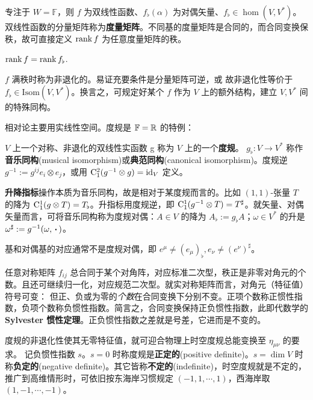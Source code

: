 专注于 $W=\mathbb F$，则 $f$ 为双线性函数、$f_\flat(\alpha)$ 为对偶矢量、$f_\flat\in\hom(V,V^*)$。
双线性函数的分量矩阵称为\textbf{度量矩阵}。不同基的度量矩阵是合同的，而合同变换保秩，故可直接定义 $\rank f$ 为任意度量矩阵的秩。

\begin{theorem}
    $\rank f=\rank f_\flat$.
\end{theorem}

$f$ 满秩时称为非退化的。易证充要条件是分量矩阵可逆，或
故非退化性等价于 $f_\flat\in\mathrm{Isom}(V,V^*)$。换言之，可规定好某个 $f$ 作为 $V$ 上的额外结构，建立 $V,V^*$ 间的特殊同构。

相对论主要用实线性空间。度规是 $\mathbb F=\mathbb{R}$ 的特例：

\begin{definition}
    $V$ 上一个对称、非退化的双线性实函数 g 称为 $V$ 上的一个\textbf{度规}。 $g_\flat:V\to V^*$ 称作\textbf{音乐同构}(musical isomorphism)或\textbf{典范同构}(canonical isomorphism)。度规逆 $g^{-1}:=g^{ij} e_i\otimes e_j$，或用 $\mathrm{C}^2_1(g^{-1}\otimes g)=\mathrm{id}_V$ 定义。
\end{definition}

\begin{definition}
    \textbf{升降指标}操作本质为音乐同构，故是相对于某度规而言的。比如 $(1,1)$-张量 $T$ 的降为
    $\mathrm{C}_1^1(g\otimes T)=T_\flat$。升指标用度规逆，即 $\mathrm{C}_1^1(g^{-1}\otimes T)=T^\sharp$。就矢量、对偶矢量而言，可将音乐同构称为度规对偶：$A\in V$ 的降为 $A_\flat:=g_\flat A$；$\omega\in V^*$ 的升是 $\omega^\sharp:=g^{-1}(\omega,\oo)$。
\end{definition}

\begin{remark}
    基和对偶基的对应通常不是度规对偶，即 $e^\mu\ne (e_\mu)_\flat, e_\nu\ne (e^\nu)^\sharp$。
\end{remark}

任意对称矩阵 $f_{ij}$ 总合同于某个对角阵，对应标准二次型，秩正是非零对角元的个数。且还可继续归一化，对应规范二次型。就实对称矩阵而言，对角元（特征值）符号可变：
但正、负或为零的\textit{个数}在合同变换下分别不变。正项个数称正惯性指数，负项个数称负惯性指数。简言之，合同变换保持正负惯性指数，此即代数学的 \textbf{Sylvester 惯性定理}。正负惯性指数之差就是号差，它进而是不变的。

度规的非退化性使其无零特征值，就可迎合物理上时空度规总能变换至 $\eta_{\mu\nu}$ 的要求。
记负惯性指数 $s$。$s=0$ 时称度规是\textbf{正定的}(positive definite)。$s=\dim V$ 时称\textbf{负定的}(negative definite)。其它皆称\textbf{不定的}(indefinite)，时空度规就是不定的，推广到高维情形时，可依旧按东海岸习惯规定 $(-1,1,\cdots,1)$，西海岸取 $(1,-1,\cdots,-1)$。

